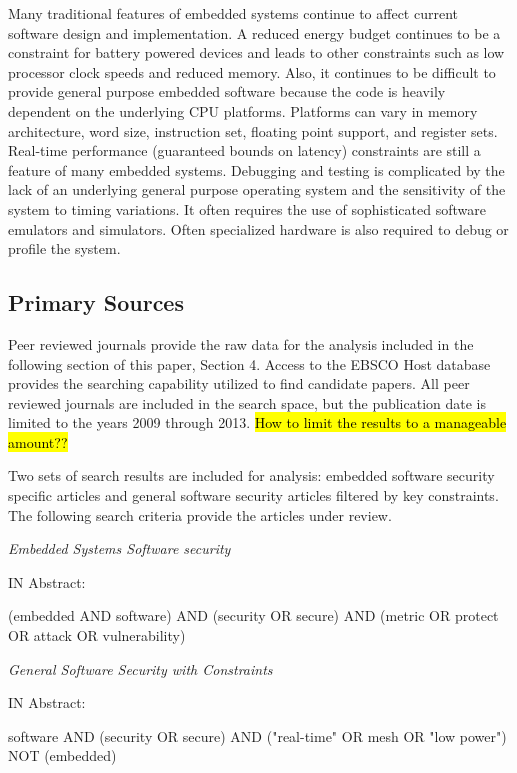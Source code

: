 \documentclass[final]{article}
\begin{document}
Many traditional features of embedded systems continue to affect current software design and implementation.  A reduced energy budget continues to be a constraint for battery powered devices and leads to other constraints such as low processor clock speeds and reduced memory.  Also, it continues to be difficult to provide general purpose embedded software because the code is heavily dependent on the underlying CPU platforms.  Platforms can vary in memory architecture, word size, instruction set,  floating point support, and register sets.  Real-time performance (guaranteed bounds on latency) constraints are still a feature of many embedded systems. Debugging and testing is complicated by the lack of an underlying general purpose operating system and the sensitivity of the system to timing variations.  It often requires the use of sophisticated software emulators and simulators.   Often specialized hardware is also required to debug or profile the system.

\subsection{Primary Sources}

Peer reviewed journals provide the raw data for the analysis included in the following section of this paper, Section 4.  Access to the EBSCO Host database provides the searching capability utilized to find candidate papers.  All peer reviewed journals are included in the search space, but the publication date is limited to the years 2009 through 2013.  \hl{How to limit the results to a manageable amount??}

Two sets of search results are included for analysis: embedded software security specific articles and general software security articles filtered by key constraints.  The following search criteria provide the articles under review. 

\textit{Embedded Systems Software security}

IN Abstract:

\begin{center}
(embedded AND software) AND (security OR secure) AND (metric OR protect OR attack OR vulnerability)
\end{center}

\textit{General Software Security with Constraints}

IN Abstract:
\begin{center}
software AND (security OR secure) AND ("real-time" OR mesh OR "low power") NOT (embedded)
\end{center}
\end{document}
